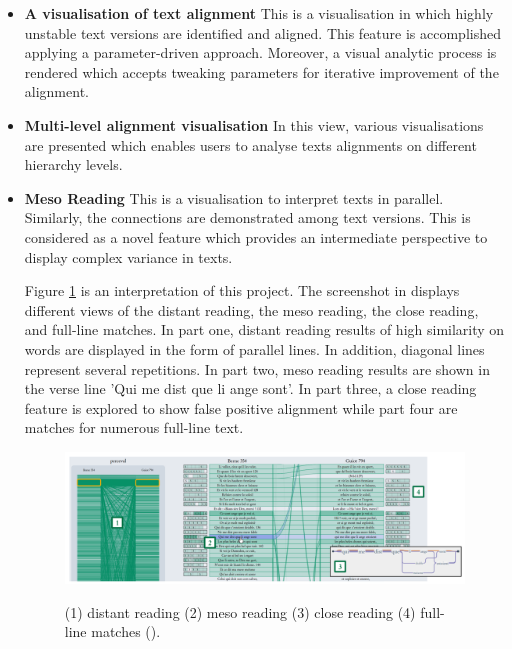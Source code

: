 \begin{itemize}
	\item \textbf{A visualisation of text alignment} This is a visualisation in which highly unstable text versions are identified and aligned. This feature is accomplished applying a parameter-driven approach. Moreover, a visual analytic process is rendered which accepts tweaking parameters for iterative improvement of the alignment.
	\item \textbf{Multi-level alignment visualisation} In this view, various visualisations are presented which enables users to analyse texts alignments on different hierarchy levels.
	\item \textbf{Meso Reading} This is a visualisation to interpret texts in parallel. Similarly, the connections are demonstrated among text versions. This is considered as a novel feature which provides an intermediate perspective to display complex variance in texts.
	
Figure \ref{fig:mesoReading} is an interpretation of this project. The screenshot in \cite{Stefan2017} displays different views of the distant reading, the meso reading, the close reading, and full-line matches. In part one, distant reading results of high similarity on words are displayed in the form of parallel lines. In addition, diagonal lines represent several repetitions. In part two, meso reading results are shown in the verse line ’Qui me dist que li ange sont’.  In part three, a close reading feature is explored to show false positive alignment while part four are matches for numerous full-line text.
	
	\begin{figure}[H]
		\centering    
		\includegraphics[scale=0.5]{Figs/Meso-Reading}\\[1ex]
		\caption{ (1) distant reading (2) meso reading (3) close reading (4) full-line matches (\cite{Stefan2017}).}
		\label{fig:mesoReading}
	\end{figure} 
	
	
\end{itemize}

